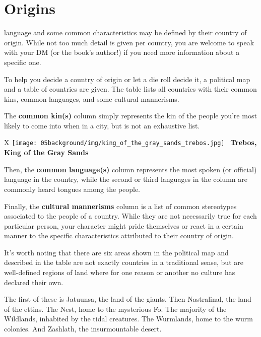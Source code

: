 \section{Origins}

language and some common characteristics may be defined by their country of origin.
While not too much detail is given per country, you are welcome to speak with your DM (or the book's author!) if you need more information about a specific one.

To help you decide a country of origin or let a die roll decide it, a political map and a table of countries are given.
The table lists all countries with their common kins, common languages, and some cultural mannerisms.

The \textbf{common kin(s)} column simply represents the kin of the people you're most likely to come into when in a city, but is not an exhaustive list.

\begin{table*}[b]%
    \begin{DndTable}[width=\linewidth]{X}
        \centering
        \texttt{[image: 05background/img/king\_of\_the\_gray\_sands\_trebos.jpg]} \
        \centering \large{\textbf{Trebos, King of the Gray Sands}}
    \end{DndTable}
\end{table*}

Then, the \textbf{common language(s)} column represents the most spoken (or official) language in the country, while the second or third languages in the column are commonly heard tongues among the people.

Finally, the \textbf{cultural mannerisms} column is a list of common stereotypes associated to the people of a country.
While they are not necessarily true for each particular person, your character might pride themselves or react in a certain manner to the specific characteristics attributed to their country of origin.

It's worth noting that there are six areas shown in the political map and described in the table are not exactly countries in a traditional sense, but are well-defined regions of land where for one reason or another no culture has declared their own.

The first of these is Jatuunsa, the land of the giants.
Then Nastralinal, the land of the ettins.
The Nest, home to the mysterious Fo.
The majority of the Wildlands, inhabited by the tidal creatures.
The Wurmlands, home to the wurm colonies.
And Zashlath, the insurmountable desert.

